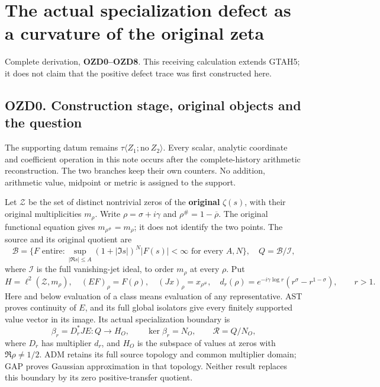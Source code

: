 \section{The actual specialization defect as a curvature of the original
zeta}\label{the-actual-specialization-defect-as-a-curvature-of-the-original-zeta}

Complete derivation, \textbf{OZD0--OZD8}. This receiving calculation
extends GTAH5; it does not claim that the positive defect trace was
first constructed here.

\subsection{OZD0. Construction stage, original objects and the
question}\label{ozd0.-construction-stage-original-objects-and-the-question}

The supporting datum remains
\(\tau\langle Z_1;\mathrm{no}\ Z_2\rangle\). Every scalar, analytic
coordinate and coefficient operation in this note occurs after the
complete-history arithmetic reconstruction. The two branches keep their
own counters. No addition, arithmetic value, midpoint or metric is
assigned to the support.

Let \(\mathscr Z\) be the set of distinct nontrivial zeros of the
\textbf{original} \(\zeta(s)\), with their original multiplicities
\(m_\rho\). Write \(\rho=\sigma+i\gamma\) and
\(\rho^\#=1-\overline\rho\). The original functional equation gives
\(m_{\rho^\#}=m_\rho\); it does not identify the two points. The source
and its original quotient are \[
\mathcal B=\{F\text{ entire}:\sup_{|\Re s|\le A}(1+|\Im s|)^N|F(s)|<\infty\text{ for every }A,N\},
\quad Q=\mathcal B/\mathcal I,
\tag{OZD0.1}
\] where \(\mathcal I\) is the full vanishing-jet ideal, to order
\(m_\rho\) at every \(\rho\). Put \[
H=\ell^2(\mathscr Z,m_\rho),\quad (EF)_\rho=F(\rho),\quad
(Jx)_\rho=x_{\rho^\#},\quad
d_r(\rho)=e^{-i\gamma\log r}(r^\sigma-r^{1-\sigma}),\qquad r>1.
\tag{OZD0.2}
\] Here and below evaluation of a class means evaluation of any
representative. AST proves continuity of \(E\), and its full global
isolators give every finitely supported value vector in its image. Its
actual specialization boundary is \[
\beta_r=D_r^*JE:Q\longrightarrow H_O,\qquad
\ker\beta_r=N_O,\qquad \mathcal R=Q/N_O,
\tag{OZD0.3}
\] where \(D_r\) has multiplier \(d_r\), and \(H_O\) is the subspace of
values at zeros with \(\Re\rho\ne1/2\). ADM retains its full source
topology and common multiplier domain; GAP proves Gaussian approximation
in that topology. Neither result replaces this boundary by its zero
positive-transfer quotient.

